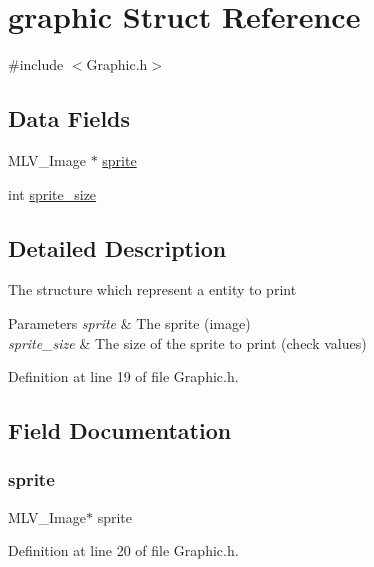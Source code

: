 \hypertarget{structgraphic}{}\section{graphic Struct Reference}
\label{structgraphic}


{\ttfamily \#include $<$Graphic.\+h$>$}

\subsection*{Data Fields}
\begin{DoxyCompactItemize}
\item 
M\+L\+V\+\_\+\+Image $\ast$ \hyperlink{structgraphic_a1f2be7d48320352c7d85af7960792bc5}{sprite}
\item 
int \hyperlink{structgraphic_aab4af5e471f473d0a94d8ea7e8e43f06}{sprite\+\_\+size}
\end{DoxyCompactItemize}


\subsection{Detailed Description}
The structure which represent a entity to print 
\begin{DoxyParams}{Parameters}
{\em sprite} & The sprite (image) \\
\hline
{\em sprite\+\_\+size} & The size of the sprite to print (check values) \\
\hline
\end{DoxyParams}


Definition at line 19 of file Graphic.\+h.



\subsection{Field Documentation}
\mbox{\label{structgraphic_a1f2be7d48320352c7d85af7960792bc5}} 
\subsubsection{\texorpdfstring{sprite}{sprite}}
{\footnotesize\ttfamily M\+L\+V\+\_\+\+Image$\ast$ sprite}



Definition at line 20 of file Graphic.\+h.

